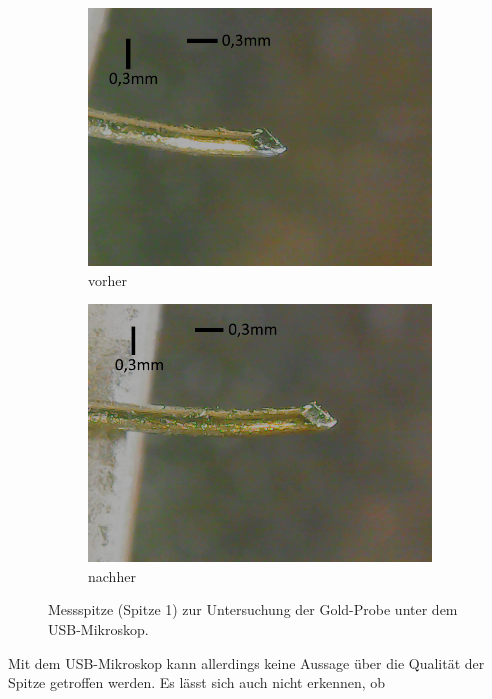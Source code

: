 \begin{figure}[H]
    \centering
    \begin{subfigure}{0.45\textwidth}
        \centering
        \includegraphics[width=\linewidth]{../figs/spitze1_vorher}
        \caption{vorher}
    \end{subfigure}
    \begin{subfigure}{0.45\textwidth}
        \centering
        \includegraphics[width=\linewidth]{../figs/spitze1_nachher}
        \caption{nachher}
    \end{subfigure}
    \caption{Messspitze (Spitze 1) zur Untersuchung der Gold-Probe unter dem USB-Mikroskop.}\label{fig:spitze1}
\end{figure} Mit dem USB-Mikroskop kann allerdings keine Aussage über die Qualität der Spitze getroffen werden. Es lässt sich auch nicht erkennen, ob
